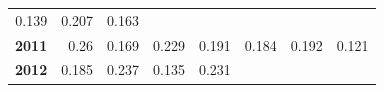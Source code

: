 \documentclass[]{article}
\begin{document}
\begin{longtable}[]{@{}rrrrrrrr@{}}
\begin{minipage}[t]{0.09\columnwidth}
0.139\strut
\end{minipage} & \begin{minipage}[t]{0.08\columnwidth}\raggedleft\strut
0.207\strut
\end{minipage} & \begin{minipage}[t]{0.10\columnwidth}\raggedleft\strut
0.163\strut
\end{minipage}\tabularnewline
\begin{minipage}[t]{0.08\columnwidth}\raggedleft\strut
\textbf{2011}\strut
\end{minipage} & \begin{minipage}[t]{0.10\columnwidth}\raggedleft\strut
0.26\strut
\end{minipage} & \begin{minipage}[t]{0.11\columnwidth}\raggedleft\strut
0.169\strut
\end{minipage} & \begin{minipage}[t]{0.08\columnwidth}\raggedleft\strut
0.229\strut
\end{minipage} & \begin{minipage}[t]{0.14\columnwidth}\raggedleft\strut
0.191\strut
\end{minipage} & \begin{minipage}[t]{0.09\columnwidth}\raggedleft\strut
0.184\strut
\end{minipage} & \begin{minipage}[t]{0.08\columnwidth}\raggedleft\strut
0.192\strut
\end{minipage} & \begin{minipage}[t]{0.10\columnwidth}\raggedleft\strut
0.121\strut
\end{minipage}\tabularnewline
\begin{minipage}[t]{0.08\columnwidth}\raggedleft\strut
\textbf{2012}\strut
\end{minipage} & \begin{minipage}[t]{0.10\columnwidth}\raggedleft\strut
0.185\strut
\end{minipage} & \begin{minipage}[t]{0.11\columnwidth}\raggedleft\strut
0.237\strut
\end{minipage} & \begin{minipage}[t]{0.08\columnwidth}\raggedleft\strut
0.135\strut
\end{minipage} & \begin{minipage}[t]{0.14\columnwidth}\raggedleft\strut
0.231\strut
\end{minipage} & \begin{minipage}[t]{0.09\columnwidth}\raggedleft\strut

\end{minipage}
\end{longtable}
\end{document}
